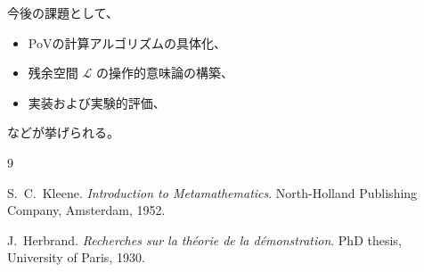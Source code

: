 \documentclass[11pt,a4paper]{article}
\newcommand{\Lspace}{\mathcal{L}}
\begin{document}
今後の課題として、
\begin{itemize}
\item PoVの計算アルゴリズムの具体化、
\item 残余空間 $\Lspace$ の操作的意味論の構築、
\item 実装および実験的評価、
\end{itemize}
などが挙げられる。

\begin{thebibliography}{9}

S.~C.~Kleene.
\newblock \emph{Introduction to Metamathematics}.
\newblock North-Holland Publishing Company, Amsterdam, 1952.

J.~Herbrand.
\newblock \emph{Recherches sur la th\'eorie de la d\'emonstration}.
\newblock PhD thesis, University of Paris, 1930.

\end{thebibliography}
\end{document}
